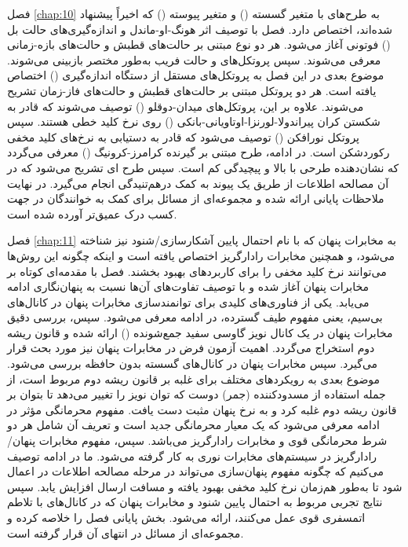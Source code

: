 فصل \ref{chap:10} به طرح‌های  با متغیر گسسته () و متغیر پیوسته () که اخیراً پیشنهاد شده‌اند، اختصاص دارد. فصل با توصیف اثر هونگ-او-ماندل و اندازه‌گیری‌های حالت بل () فوتونی آغاز می‌شود. هر دو نوع  مبتنی بر حالت‌های قطبش و حالت‌های بازه-زمانی معرفی می‌شوند. سپس پروتکل‌های  و حالت فریب به‌طور مختصر بازبینی می‌شوند. موضوع بعدی در این فصل به پروتکل‌های  مستقل از دستگاه اندازه‌گیری () اختصاص یافته است. هر دو پروتکل  مبتنی بر حالت‌های قطبش و حالت‌های فاز-زمان تشریح می‌شوند. علاوه‌ بر این، پروتکل‌های  میدان-دوقلو () توصیف می‌شوند که قادر به شکستن کران پیراندولا-لورنزا-اوتاویانی-بانکی () روی نرخ کلید خطی هستند. سپس پروتکل  نورافکن () توصیف می‌شود که قادر به دستیابی به نرخ‌های کلید مخفی رکوردشکن است. در ادامه، طرح  مبتنی بر گیرنده کرامرز-کرونیگ () معرفی می‌گردد که نشان‌دهنده طرحی با  بالا و پیچیدگی کم است. سپس طرح ای تشریح می‌شود که در آن مصالحه اطلاعات از طریق یک پیوند به کمک درهم‌تنیدگی انجام می‌گیرد. در نهایت ملاحظات پایانی ارائه شده و مجموعه‌ای از مسائل برای کمک به خوانندگان در جهت کسب درک عمیق‌تر آورده شده است.

فصل \ref{chap:11} به مخابرات پنهان که با نام احتمال پایین آشکارسازی/شنود نیز شناخته می‌شود، و همچنین مخابرات رادارگریز اختصاص یافته است و اینکه چگونه این روش‌ها می‌توانند نرخ کلید مخفی را برای کاربردهای  بهبود بخشند. فصل با مقدمه‌ای کوتاه بر مخابرات پنهان آغاز شده و با توصیف تفاوت‌های آن‌ها نسبت به پنهان‌نگاری ادامه می‌یابد. یکی از فناوری‌های کلیدی برای توانمندسازی مخابرات پنهان در کانال‌های بی‌سیم، یعنی مفهوم طیف گسترده، در ادامه معرفی می‌شود. سپس، بررسی دقیق مخابرات پنهان در یک کانال نویز گاوسی سفید جمع‌شونده () ارائه شده و قانون ریشه دوم استخراج می‌گردد. اهمیت آزمون فرض در مخابرات پنهان نیز مورد بحث قرار می‌گیرد. سپس مخابرات پنهان در کانال‌های گسسته بدون حافظه بررسی می‌شود. موضوع بعدی به رویکردهای مختلف برای غلبه بر قانون ریشه دوم مربوط است، از جمله استفاده از مسدودکننده (جمر) دوست که توان نویز را تغییر می‌دهد تا بتوان بر قانون ریشه دوم غلبه کرد و به نرخ پنهان مثبت دست یافت. مفهوم محرمانگی مؤثر در ادامه معرفی می‌شود که یک معیار محرمانگی جدید است و تعریف آن شامل هر دو شرط محرمانگی قوی و مخابرات رادارگریز می‌باشد. سپس، مفهوم مخابرات پنهان/رادارگریز در سیستم‌های مخابرات نوری به کار گرفته می‌شود. ما در ادامه توصیف می‌کنیم که چگونه مفهوم پنهان‌سازی می‌تواند در مرحله مصالحه اطلاعات در  اعمال شود تا به‌طور هم‌زمان نرخ کلید مخفی بهبود یافته و مسافت ارسال افزایش یابد. سپس نتایج تجربی مربوط به احتمال پایین شنود و مخابرات پنهان که در کانال‌های با تلاطم اتمسفری قوی عمل می‌کنند، ارائه می‌شود. بخش پایانی فصل را خلاصه کرده و مجموعه‌ای از مسائل در انتهای آن قرار گرفته است.

